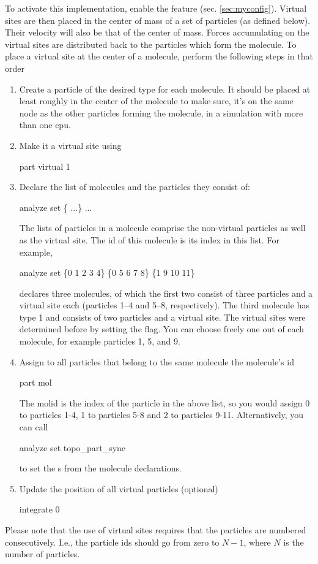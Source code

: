 To activate this implementation, enable the feature
 (sec. \ref{sec:myconfig}).  Virtual sites
are then placed in the center of mass of a set of particles (as
defined below). Their velocity will also be that of the center of
mass. Forces accumulating on the virtual sites are distributed back to
the particles which form the molecule.  To place a virtual site at the
center of a molecule, perform the following steps in that order
\begin{enumerate}
\item Create a particle of the desired type for each molecule. It
  should be placed at least roughly in the center of the molecule to
  make sure, it's on the same node as the other particles forming the
  molecule, in a simulation with more than one cpu.
\item Make it a virtual site using 
  \begin{essyntaxbox}
    part  virtual 1
  \end{essyntaxbox}
\item Declare the list of molecules and the particles they consist of:
  \begin{essyntaxbox}
    analyze set \{  ...\} ...
  \end{essyntaxbox}
  The lists of particles in a molecule comprise the non-virtual
  particles as well as the virtual site. The id of this molecule is
  its index in this list. For example,
  \begin{code}
    analyze set \{0 1 2 3 4\} \{0 5 6 7 8\} \{1 9 10 11\}
  \end{code}
  declares three molecules, of which the first two consist of three
  particles and a virtual site each (particles 1--4 and 5--8,
  respectively). The third molecule has type 1 and consists of two
  particles and a virtual site. The virtual sites were determined
  before by setting the  flag. You can choose freely one
  out of each molecule, for example particles 1, 5, and 9.
\item Assign to all particles that belong to the same molecule the
  molecule's id
  \begin{essyntaxbox}
    part  mol 
  \end{essyntaxbox}
  The molid is the index of the particle in the above list, so you
  would assign  0 to particles 1-4,  1 to
  particles 5-8 and  2 to particles 9-11. Alternatively,
  you can call
  \begin{essyntaxbox}
    analyze set topo_part_sync
  \end{essyntaxbox}
  to set the s from the molecule declarations.
\item Update the position of all virtual particles (optional)
  \begin{essyntaxbox}
    integrate 0
  \end{essyntaxbox}
\end{enumerate}
Please note that the use of virtual sites requires that the particles are numbered consecutively. I.e., the particle ids should go from zero to $N-1$, where $N$ is the number of particles.

